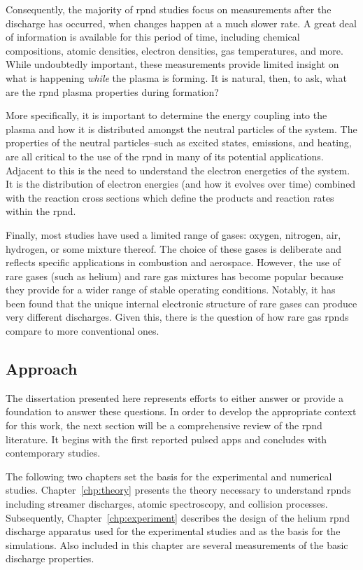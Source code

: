 Consequently, the majority of \acs{rpnd} studies focus on measurements after the
discharge has occurred, when changes happen at a much slower rate. A great deal
of information is available for this period of time, including chemical
compositions, atomic densities, electron densities, gas temperatures, and more.
While undoubtedly important, these measurements provide limited insight on what
is happening \emph{while} the plasma is forming. It is natural, then, to ask,
what are the \acs{rpnd} plasma properties during formation?

More specifically, it is important to determine the energy coupling into the
plasma and how it is distributed amongst the neutral particles of the system.
The properties of the neutral particles--such as excited states, emissions, and
heating, are all critical to the use of the \acs{rpnd} in many of its potential
applications. Adjacent to this is the need to understand the electron energetics
of the system. It is the distribution of electron energies (and how it evolves
over time) combined with the reaction cross sections which define the products
and reaction rates within the \acs{rpnd}.

Finally, most studies have used a limited range of gases: oxygen, nitrogen, air,
hydrogen, or some mixture thereof. The choice of these gases is deliberate and
reflects specific applications in combustion and aerospace. However, the use of
rare gases (such as helium) and rare gas mixtures has become popular because
they provide for a wider range of stable operating conditions. Notably, it has
been found that the unique internal electronic structure of rare gases can
produce very different discharges. Given this, there is the question of how rare
gas \acs{rpnd}s compare to more conventional ones.

\subsection{Approach}

The dissertation presented here represents efforts to either answer or provide a
foundation to answer these questions. In order to develop the appropriate
context for this work, the next section will be a comprehensive review of the
\acs{rpnd} literature. It begins with the first reported pulsed \acs{app}s and
concludes with contemporary studies.

The following two chapters set the basis for the experimental and numerical
studies. Chapter~\ref{chp:theory} presents the theory necessary to understand
\acs{rpnd}s including streamer discharges, atomic spectroscopy, and collision
processes. Subsequently, Chapter~\ref{chp:experiment} describes the design of
the helium \acs{rpnd} discharge apparatus used for the experimental studies and
as the basis for the simulations. Also included in this chapter are several
measurements of the basic discharge properties.

